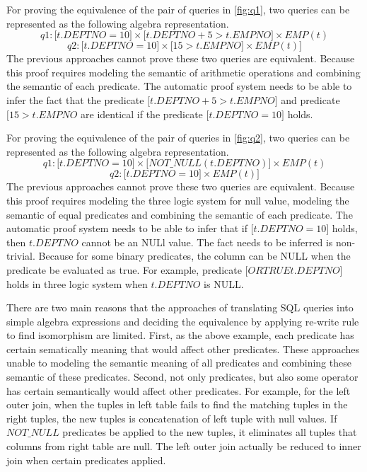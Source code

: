 For proving the equivalence of the pair of queries in \autoref{fig:q1}, two queries can be 
represented as the following algebra representation.
%
\[q1 : \lbrack t.DEPTNO = 10 \rbrack \times \lbrack t.DEPTNO + 5 > t.EMPNO \rbrack \times EMP(t)\]
%
\[q2:  \lbrack t.DEPTNO = 10 \rbrack \times \lbrack 15 > t.EMPNO \rbrack \times EMP(t)] \]
%
The previous approaches cannot prove these two queries are equivalent.
%
Because this proof requires modeling the semantic of arithmetic operations and combining the semantic of
each predicate.
%
The automatic proof system needs to be able to infer the fact that the predicate 
$\lbrack t.DEPTNO + 5 > t.EMPNO \rbrack$ and predicate $\lbrack 15 > t.EMPNO$ are identical if the predicate
$\lbrack t.DEPTNO = 10 \rbrack$ holds.


For proving the equivalence of the pair of queries in \autoref{fig:q2}, two queries can be 
represented as the following algebra representation.
%
\[q1 : \lbrack t.DEPTNO = 10 \rbrack \times \lbrack NOT\_NULL(t.DEPTNO) \rbrack \times EMP(t)\]
%
\[q2:  \lbrack t.DEPTNO = 10 \rbrack \times EMP(t)] \]
%
The previous approaches cannot prove these two queries are equivalent.
%
Because this proof requires modeling the three logic system for null value, modeling the semantic of 
equal predicates and combining the semantic of each predicate.
%
The automatic proof system needs to be able to infer that if $\lbrack t.DEPTNO = 10 \rbrack$ holds, 
then $t.DEPTNO$ cannot be an NULl value.
%
The fact needs to be inferred is non-trivial.
%
Because for some binary predicates, the column can be NULL when the predicate be evaluated as
true.
%
For example, predicate $\lbrack OR TRUE t.DEPTNO \rbrack$ holds in three logic system when $t.DEPTNO$ is NULL.

There are two main reasons that the approaches of translating SQL queries into simple algebra expressions 
and deciding the equivalence by applying re-write rule to find isomorphism are limited.
%
First, as the above example, each predicate has certain sematically meaning that would affect other predicates.
%
These approaches unable to modeling the semantic meaning of all predicates and combining these semantic of these
predicates.
%
Second, not only predicates, but also some operator has certain semantically would affect other predicates.
%
For example, for the left outer join, when the tuples in left table fails to find the matching tuples 
in the right tuples, the new tuples is concatenation of left tuple with null values.
%
If $NOT\_NULL$ predicates be applied to the new tuples, it eliminates all tuples that columns from 
right table are null. 
%
The left outer join actually be reduced to inner join when certain predicates applied.


